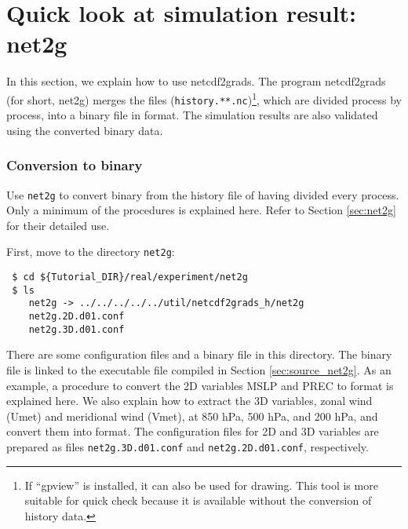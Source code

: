 \section{Quick look at simulation result: net2g} \label{sec:quicklook}

In this section, we explain how to use netcdf2grads. The program netcdf2grads (for short, net2g) merges the \netcdf files (\verb|history.**.nc|)\footnote{If ``gpview'' is installed, it can also be used for drawing. This tool is more suitable for quick check  because it is available without the conversion of history data.},  which are divided process by process, into a binary file in \grads format. The simulation results are also validated using the converted \grads binary data.

\subsubsection{Conversion to \grads binary}
Use \verb|net2g| to convert \grads binary from the history file of \netcdf having divided every process.  Only a minimum of the procedures is explained here.  Refer to Section \ref{sec:net2g} for their detailed use.

First, move to the directory \verb|net2g|:
\begin{verbatim}
 $ cd ${Tutorial_DIR}/real/experiment/net2g
 $ ls
    net2g -> ../../../../../util/netcdf2grads_h/net2g
    net2g.2D.d01.conf
    net2g.3D.d01.conf
\end{verbatim}
There are some configuration files and a binary file in this directory.  The binary file is linked to the executable file compiled in Section \ref{sec:source_net2g}. As an example,  a procedure to convert the 2D variables MSLP and PREC to \grads format is explained here. We also explain how to extract the 3D variables, zonal wind (Umet) and meridional wind (Vmet), at 850 hPa, 500 hPa, and 200 hPa, and convert them into \grads format.  The configuration files for 2D and 3D variables  are prepared as files \verb|net2g.3D.d01.conf| and \verb|net2g.2D.d01.conf|, respectively.
 
